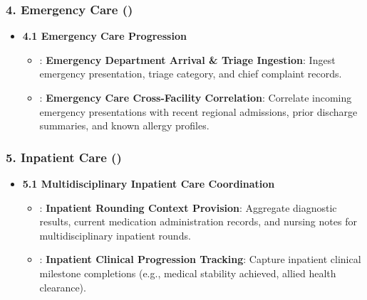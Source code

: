 \subsubsection*{4. Emergency Care (\texttt{})}
\label{rad:enabling:400}

\begin{itemize}

\item 
\textbf{4.1 Emergency Care Progression}


\begin{itemize}

\item 
\texttt{}: \textbf{Emergency Department Arrival \& Triage Ingestion}: Ingest emergency presentation, triage category, and chief complaint records.



\item 
\texttt{}: \textbf{Emergency Care Cross-Facility Correlation}: Correlate incoming emergency presentations with recent regional admissions, prior discharge summaries, and known allergy profiles.



\end{itemize}


\end{itemize}
\label{rad:enabling:404}
\subsubsection*{5. Inpatient Care (\texttt{})}
\label{rad:enabling:405}

\begin{itemize}

\item 
\textbf{5.1 Multidisciplinary Inpatient Care Coordination}


\begin{itemize}

\item 
\texttt{}: \textbf{Inpatient Rounding Context Provision}: Aggregate diagnostic results, current medication administration records, and nursing notes for multidisciplinary inpatient rounds.



\item 
\texttt{}: \textbf{Inpatient Clinical Progression Tracking}: Capture inpatient clinical milestone completions (e.g., medical stability achieved, allied health clearance).



\end{itemize}


\end{itemize}
\label{rad:enabling:409}
